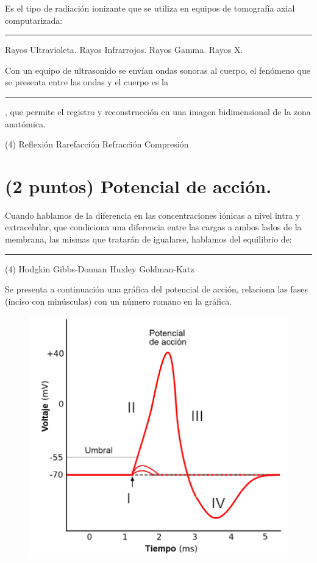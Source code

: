 \documentclass[12pt, letter]{exam}
\begin{document}
\begin{questions}
    \question Es el tipo de radiación ionizante que se utiliza en equipos de tomografía axial computarizada: \rule{2cm}{0.1mm}
    \begin{multicols}{2}
    \begin{tasks}
        \task Rayos Ultravioleta.
        \task Rayos Infrarrojos.
        \task Rayos Gamma.
        \task Rayos X.
    \end{tasks}
    \end{multicols}
    \question Con un equipo de ultrasonido se envían ondas sonoras al cuerpo, el fenómeno que se presenta entre las ondas y el cuerpo es la \rule{2cm}{0.1mm}, que permite el registro y reconstrucción en una imagen bidimensional de la zona anatómica.
    \begin{tasks}(4)
        \task Reflexión
        \task Rarefacción
        \task Refracción
        \task Compresión
    \end{tasks}

    \section{(2 puntos) Potencial de acción.}

    \question Cuando hablamos de la diferencia en las concentraciones iónicas a nivel intra y extracelular, que condiciona una diferencia entre las cargas a ambos lados de la membrana, las mismas que tratarán de igualarse, hablamos del equilibrio de: \rule{2cm}{0.1mm}
    \begin{tasks}(4)
        \task Hodgkin
        \task Gibbs-Donnan
        \task Huxley
        \task Goldman-Katz
    \end{tasks}
    \question Se presenta a continuación una gráfica del potencial de acción, relaciona las fases (inciso con minúsculas) con un número romano en la gráfica.
    \begin{figure}[H]
        \centering
        \includegraphics[scale=0.75]{Imagenes/Potencial_Accion_07.png}
    \end{figure}


\end{questions}
\end{document}
